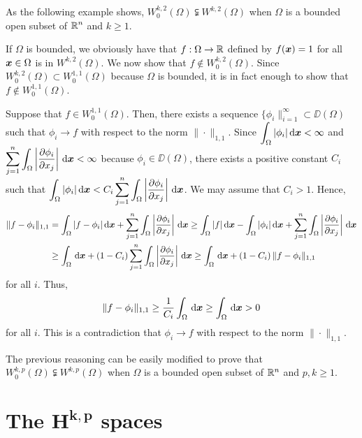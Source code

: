 \begin{egg}
As the following example shows,
$\displaystyle W^{k,2}_0(\Omega) \subsetneqq W^{k,2}(\Omega)$ when $\Omega$ is a
bounded open subset of $\displaystyle \mathbb{R}^n$ and $k\geq 1$.

If $\Omega$ is bounded, we obviously have that $f:\Omega \to \mathbb{R}$
defined by $f({\bm{x}}) = 1$ for all ${\bm{x}} \in \Omega$ is in 
$\displaystyle W^{k,2}(\Omega)$.  We now show that
$\displaystyle f \not\in W_0^{k,2}(\Omega)$.  Since
$\displaystyle W_0^{k,2}(\Omega) \subset W_0^{1,1}(\Omega)$ because
$\Omega$ is bounded, it is in fact enough to
show that $\displaystyle f \not\in W_0^{1,1}(\Omega)$.

Suppose that $\displaystyle f \in W_0^{1,1}(\Omega)$.  Then, there
exists a sequence
$\displaystyle \{\phi_i\|_{i=1}^\infty \subset \DD(\Omega)$ such that
$\phi_i \to f$ with respect to the norm $\|\cdot\|_{1,1}$.
Since $\displaystyle \int_{\Omega} |\phi_i| \,\mathrm{d}{{\bm{x}}} < \infty$ and
$\displaystyle \sum_{j=1}^n \int_{\Omega} \left| \frac{\partial{\phi_i}}{\partial x_j}
\right| \,\mathrm{d}{{\bm{x}}} < \infty$ because
$\displaystyle \phi_i \in \DD(\Omega)$, there exists a positive constant $C_i$
such that
$\displaystyle \int_{\Omega} |\phi_i| \,\mathrm{d}{{\bm{x}}} < C_i
\sum_{j=1}^n \int_{\Omega} \left| \frac{\partial{\phi_i}}{\partial x_j}
\right| \,\mathrm{d}{{\bm{x}}}$.
We may assume that $C_i > 1$.
Hence,
\begin{align*}
\|f - \phi_i\|_{1,1}
&= \int_{\Omega} |f-\phi_i| \,\mathrm{d}{{\bm{x}}} + \sum_{j=1}^n \int_{\Omega}
\left| \frac{\partial{\phi_i}}{\partial x_j} \right| \,\mathrm{d}{{\bm{x}}}
\geq \int_{\Omega} |f| \,\mathrm{d}{{\bm{x}}} - \int_{\Omega} |\phi_i| \,\mathrm{d}{{\bm{x}}}
+ \sum_{j=1}^n \int_{\Omega}
\left| \frac{\partial{\phi_i}}{\partial x_j} \right| \,\mathrm{d}{{\bm{x}}} \\
&\geq \int_{\Omega} \,\mathrm{d}{{\bm{x}}} + \left( 1- C_i\right)
\sum_{j=1}^n \int_{\Omega} \left| \frac{\partial{\phi_i}}{\partial x_j} \right| \,\mathrm{d}{{\bm{x}}}
\geq \int_{\Omega} \,\mathrm{d}{{\bm{x}}} + \left(1 - C_i\right)
\|f - \phi_i\|_{1,1}
\end{align*}
for all $i$.  Thus,
\[
\|f - \phi_i\|_{1,1} \geq \frac{1}{C_i} \int_{\Omega} \,\mathrm{d}{{\bm{x}}}
\geq \int_{\Omega} \,\mathrm{d}{{\bm{x}}} >  0
\]
for all $i$.  This is a contradiction that
$\phi_i \to f$ with respect to the norm $\|\cdot\|_{1,1}$.

The previous reasoning can be easily modified to prove that
$\displaystyle W^{k,p}_0(\Omega) \subsetneqq W^{k,p}(\Omega)$ when $\Omega$ is a
bounded open subset of $\mathbb{R}^n$ and $p,k\geq 1$.
\end{egg}

\section{The $\displaystyle \mathbf{H^{k,p}}$ spaces} \label{WequalH}

